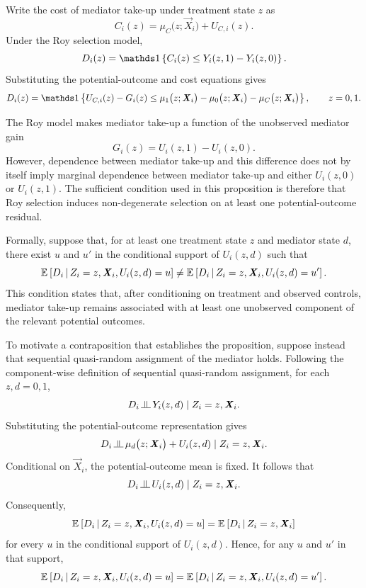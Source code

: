 Write the cost of mediator take-up under treatment state $z$ as
\[
    C_i(z)
    =
    \mu_C
    \big(
        z;\vec X_i
    \big)
    +
    U_{C,i}(z).
\]
Under the Roy selection model,
\[
    D_i(z)
    =
    \indicator{
        C_i(z)
        \leq
        Y_i(z,1)-Y_i(z,0)
    }.
    \label{eqn:roy-mediator-choice}
\]
Substituting the potential-outcome and cost equations gives
\[
    D_i(z)
    =
    \indicator{
        U_{C,i}(z)-G_i(z)
        \leq
        \mu_1
        \big(
            z;\vec X_i
        \big)
        -
        \mu_0
        \big(
            z;\vec X_i
        \big)
        -
        \mu_C
        \big(
            z;\vec X_i
        \big)
    },
    \qquad
    z=0,1.
    \label{eqn:roy-mediator-choice-residual}
\]

The Roy model makes mediator take-up a function of the unobserved mediator gain
\[
    G_i(z)
    =
    U_i(z,1)-U_i(z,0).
\]
However, dependence between mediator take-up and this difference does not by itself imply marginal dependence between mediator take-up and either $U_i(z,0)$ or $U_i(z,1)$.
The sufficient condition used in this proposition is therefore that Roy selection induces non-degenerate selection on at least one potential-outcome residual.

Formally, suppose that, for at least one treatment state $z$ and mediator state $d$, there exist $u$ and $u'$ in the conditional support of $U_i(z,d)$ such that
\[
    \mathbb{E}_{} \left[ 
        D_i
     \, \middle\vert \, 
        Z_i=z,
        \boldsymbol{\mathit{X}}_i,
        U_i(z,d)=u
     \right]\neq
    \mathbb{E}_{} \left[ 
        D_i
     \, \middle\vert \, 
        Z_i=z,
        \boldsymbol{\mathit{X}}_i,
        U_i(z,d)=u'
     \right].
\]
This condition states that, after conditioning on treatment and observed controls, mediator take-up remains associated with at least one unobserved component of the relevant potential outcomes.

To motivate a contraposition that establishes the proposition, suppose instead that sequential quasi-random assignment of the mediator holds.
Following the component-wise definition of sequential quasi-random assignment, for each $z,d=0,1$,
\[
    D_i
    \indep
    Y_i(z,d)
    \mid
    Z_i=z,
    \vec X_i.
    \label{eqn:roy-componentwise-mediator-ignorability}
\]
Substituting the potential-outcome representation gives
\[
    D_i
    \indep
    \mu_d
    \big(
        z;\vec X_i
    \big)
    +
    U_i(z,d)
    \mid
    Z_i=z,
    \vec X_i.
\]
Conditional on $\vec X_i$, the potential-outcome mean is fixed.
It follows that
\[
    D_i
    \indep
    U_i(z,d)
    \mid
    Z_i=z,
    \vec X_i.
    \label{eqn:roy-component-residual-independence}
\]
Consequently,
\[
    \mathbb{E}_{} \left[ 
        D_i
     \, \middle\vert \, 
        Z_i=z,
        \boldsymbol{\mathit{X}}_i,
        U_i(z,d)=u
     \right]
    =
    \mathbb{E}_{} \left[ 
        D_i
     \, \middle\vert \, 
        Z_i=z,
        \boldsymbol{\mathit{X}}_i
     \right]
\]
for every $u$ in the conditional support of $U_i(z,d)$.
Hence, for any $u$ and $u'$ in that support,
\[
    \mathbb{E}_{} \left[ 
        D_i
     \, \middle\vert \, 
        Z_i=z,
        \boldsymbol{\mathit{X}}_i,
        U_i(z,d)=u
     \right]=
    \mathbb{E}_{} \left[ 
        D_i
     \, \middle\vert \, 
        Z_i=z,
        \boldsymbol{\mathit{X}}_i,
        U_i(z,d)=u'
     \right].
\]

